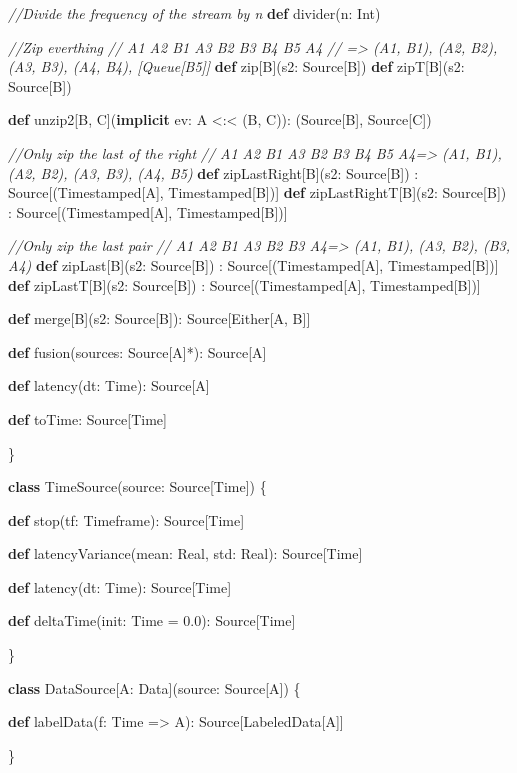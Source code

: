 \documentclass[12pt,]{article}
\newenvironment{Shaded}{\begin{snugshade}}{\end{snugshade}}
\newcommand{\KeywordTok}[1]{\textcolor[rgb]{0.13,0.29,0.53}{\textbf{#1}}}
\newcommand{\FloatTok}[1]{\textcolor[rgb]{0.00,0.00,0.81}{#1}}
\newcommand{\CommentTok}[1]{\textcolor[rgb]{0.56,0.35,0.01}{\textit{#1}}}
\newcommand{\FunctionTok}[1]{\textcolor[rgb]{0.00,0.00,0.00}{#1}}
\newcommand{\NormalTok}[1]{#1}
\begin{document}
\begin{Shaded}
\begin{Highlighting}[]
    \CommentTok{//Divide the frequency of the stream by n}
    \KeywordTok{def} \FunctionTok{divider}\NormalTok{(n: Int)}

    \CommentTok{//Zip everthing}
    \CommentTok{// A1 A2 B1 A3 B2 B3 B4 B5 A4}
    \CommentTok{// => (A1, B1), (A2, B2), (A3, B3), (A4, B4), [Queue[B5]]}
    \KeywordTok{def}\NormalTok{ zip[B](s2: Source[B])   }
    \KeywordTok{def}\NormalTok{ zipT[B](s2: Source[B])}

    \KeywordTok{def}\NormalTok{ unzip2[B, C](}\KeywordTok{implicit}\NormalTok{ ev: A <:< (B, C)): (Source[B], Source[C]) }

    \CommentTok{//Only zip the last of the right}
    \CommentTok{// A1 A2 B1 A3 B2 B3 B4 B5 A4=> (A1, B1), (A2, B2), (A3, B3), (A4, B5)}
    \KeywordTok{def}\NormalTok{ zipLastRight[B](s2: Source[B])}
\NormalTok{        : Source[(Timestamped[A], Timestamped[B])]  }
    \KeywordTok{def}\NormalTok{ zipLastRightT[B](s2: Source[B])}
\NormalTok{        : Source[(Timestamped[A], Timestamped[B])]  }
    
    \CommentTok{//Only zip the last pair}
    \CommentTok{// A1 A2 B1 A3 B2 B3 A4=> (A1, B1), (A3, B2), (B3, A4)}
    \KeywordTok{def}\NormalTok{ zipLast[B](s2: Source[B])}
\NormalTok{        : Source[(Timestamped[A], Timestamped[B])]  }
    \KeywordTok{def}\NormalTok{ zipLastT[B](s2: Source[B])}
\NormalTok{        : Source[(Timestamped[A], Timestamped[B])]  }
  
    \KeywordTok{def}\NormalTok{ merge[B](s2: Source[B]): Source[Either[A, B]]}
    
    \KeywordTok{def} \FunctionTok{fusion}\NormalTok{(sources: Source[A]*): Source[A]}
    
    \KeywordTok{def} \FunctionTok{latency}\NormalTok{(dt: Time): Source[A]}
    
    \KeywordTok{def}\NormalTok{ toTime: Source[Time]}

\NormalTok{\}}

\KeywordTok{class} \FunctionTok{TimeSource}\NormalTok{(source: Source[Time]) \{}

  \KeywordTok{def} \FunctionTok{stop}\NormalTok{(tf: Timeframe): Source[Time]}

  \KeywordTok{def} \FunctionTok{latencyVariance}\NormalTok{(mean: Real, std: Real): Source[Time]}
  
  \KeywordTok{def} \FunctionTok{latency}\NormalTok{(dt: Time): Source[Time] }
  
  \KeywordTok{def} \FunctionTok{deltaTime}\NormalTok{(init: Time = }\FloatTok{0.0}\NormalTok{): Source[Time]}
  
\NormalTok{\}}

\KeywordTok{class}\NormalTok{ DataSource[A: Data](source: Source[A]) \{}

  \KeywordTok{def} \FunctionTok{labelData}\NormalTok{(f: Time => A): Source[LabeledData[A]]}
  
\NormalTok{\}}
\end{Highlighting}
\end{Shaded}
\end{document}
